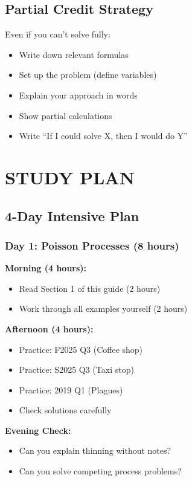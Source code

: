 \documentclass[10pt,letterpaper]{article}
\begin{document}
\subsection{Partial Credit Strategy}

Even if you can't solve fully:
\begin{itemize}[leftmargin=*]
  \item Write down relevant formulas
  \item Set up the problem (define variables)
  \item Explain your approach in words
  \item Show partial calculations
  \item Write ``If I could solve X, then I would do Y''
\end{itemize}

\newpage

\section{STUDY PLAN}

\subsection{4-Day Intensive Plan}

\subsubsection{Day 1: Poisson Processes (8 hours)}

\textbf{Morning (4 hours):}
\begin{itemize}
  \item Read Section 1 of this guide (2 hours)
  \item Work through all examples yourself (2 hours)
\end{itemize}

\textbf{Afternoon (4 hours):}
\begin{itemize}
  \item Practice: F2025 Q3 (Coffee shop)
  \item Practice: S2025 Q3 (Taxi stop)
  \item Practice: 2019 Q1 (Plagues)
  \item Check solutions carefully
\end{itemize}

\textbf{Evening Check:}
\begin{itemize}
  \item Can you explain thinning without notes?
  \item Can you solve competing process problems?
\end{itemize}
\end{document}
